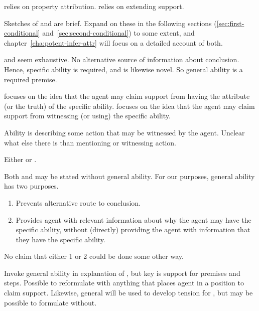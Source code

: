 \begin{note}
\begin{note}
  \AR{} relies on property attribution.
  \WR{} relies on extending support.
\end{note}

\end{note}

\begin{note}
  Sketches of \AR{} and \WR{} are brief.
  Expand on these in the following sections (\ref{sec:first-conditional} and~\ref{sec:second-conditional}) to some extent, and chapter~\ref{cha:potent-infer-attr} will focus on a detailed account of both.
\end{note}

\begin{note}
  \AR{} and \WR{} seem exhaustive.
  No alternative source of information about conclusion.
  Hence, specific ability is required, and is likewise novel.
  So general ability is a required premise.

  \AR{} focuses on the idea that the agent may claim support from having the attribute (or the truth) of the specific ability.
  \WR{} focuses on the idea that the agent may claim support from witnessing (or using) the specific ability.

  Ability is describing some action that may be witnessed by the agent.
  Unclear what else there is than mentioning or witnessing action.

  \begin{proposition}\label{either-AR-or-WR}
    Either \WR{} or \AR{}.
  \end{proposition}
\end{note}

\begin{note}
  Both \AR{} and \WR{} may be stated without general ability.
  For our purposes, general ability has two purposes.
  \begin{enumerate}
  \item Prevents alternative route to conclusion.
  \item Provides agent with relevant information about why the agent may have the specific ability, without (directly) providing the agent with information that they have the specific ability.
  \end{enumerate}
  No claim that either 1 or 2 could be done some other way.

  Invoke general ability in explanation of \WR{}, but key is support for premises and steps.
  Possible to reformulate with anything that places agent in a position to claim support.
  Likewise, general will be used to develop tension for \AR{}, but may be possible to formulate without.
\end{note}

